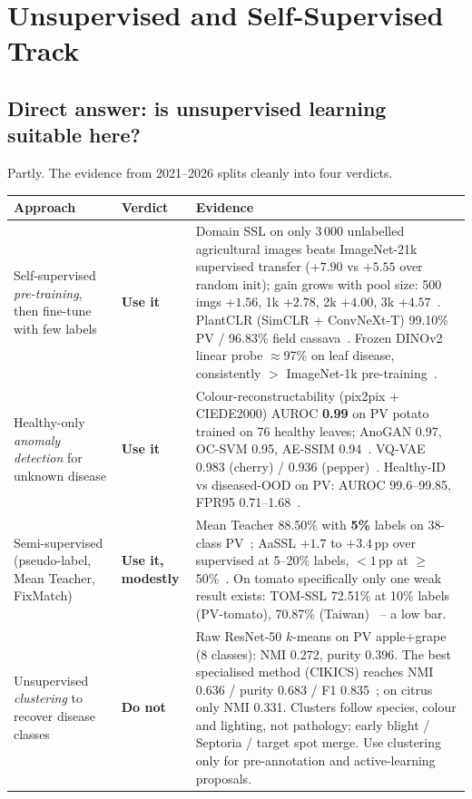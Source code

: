 \section{Unsupervised and Self-Supervised Track}
\label{sec:unsup}

\subsection{Direct answer: is unsupervised learning suitable here?}
Partly. The evidence from 2021--2026 splits cleanly into four verdicts.

\begin{center}\small
\begin{tabular}{@{}L{3.4cm}L{1.7cm}L{10.2cm}@{}}
\toprule
Approach & Verdict & Evidence \\
\midrule
Self-supervised \emph{pre-training}, then fine-tune with few labels & \textbf{Use it} & Domain SSL on only 3\,000 unlabelled agricultural images beats ImageNet-21k supervised transfer ($+7.90$ vs $+5.55$ over random init); gain grows with pool size: 500 imgs $+1.56$, 1k $+2.78$, 2k $+4.00$, 3k $+4.57$~\cite{sonavane2026}. PlantCLR (SimCLR + ConvNeXt-T) 99.10\% PV / 96.83\% field cassava~\cite{plantclr}. Frozen DINOv2 linear probe $\approx$97\% on leaf disease, consistently $>$ ImageNet-1k pre-training~\cite{espejo2025}. \\
Healthy-only \emph{anomaly detection} for unknown disease & \textbf{Use it} & Colour-reconstructability (pix2pix + CIEDE2000) AUROC \textbf{0.99} on PV potato trained on 76 healthy leaves; AnoGAN 0.97, OC-SVM 0.95, AE-SSIM 0.94~\cite{katafuchi2021}. VQ-VAE 0.983 (cherry) / 0.936 (pepper)~\cite{calabro2022}. Healthy-ID vs diseased-OOD on PV: AUROC 99.6--99.85, FPR95 0.71--1.68~\cite{dong2025}. \\
Semi-supervised (pseudo-label, Mean Teacher, FixMatch) & \textbf{Use it, modestly} & Mean Teacher 88.50\% with \textbf{5\%} labels on 38-class PV~\cite{ilsever2024}; AaSSL $+1.7$ to $+3.4$\,pp over supervised at 5--20\% labels, $<1$\,pp at $\ge$50\%~\cite{aassl2025}. On tomato specifically only one weak result exists: TOM-SSL 72.51\% at 10\% labels (PV-tomato), 70.87\% (Taiwan)~\cite{tomssl2025} -- a low bar. \\
Unsupervised \emph{clustering} to recover disease classes & \textbf{Do not} & Raw ResNet-50 $k$-means on PV apple+grape (8 classes): NMI 0.272, purity 0.396. The best specialised method (CIKICS) reaches NMI 0.636 / purity 0.683 / F1 0.835~\cite{cikics}; on citrus only NMI 0.331. Clusters follow species, colour and lighting, not pathology; early blight / Septoria / target spot merge. Use clustering only for pre-annotation and active-learning proposals. \\

\end{tabular}
\end{center}
